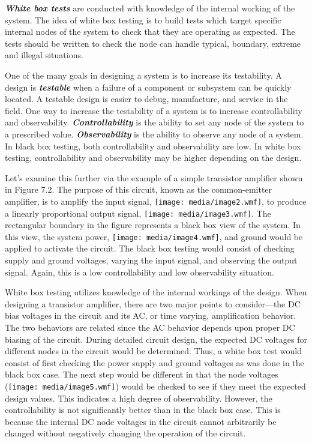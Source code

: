 \emph{\textbf{White box tests}} are conducted with knowledge of the
internal working of the system. The idea of white box testing is to
build tests which target specific internal nodes of the system to check
that they are operating as expected. The tests should be written to
check the node can handle typical, boundary, extreme and illegal
situations.

One of the many goals in designing a system is to increase its
testability. A design is \emph{\textbf{testable}} when a failure of a
component or subsystem can be quickly located. A testable design is
easier to debug, manufacture, and service in the field. One way to
increase the testability of a system is to increase controllability and
observability. \emph{\textbf{Controllability}} is the ability to set any
node of the system to a prescribed value. \textbf{\emph{Observability}}
is the ability to observe any node of a system. In black box testing,
both controllability and observability are low. In white box testing,
controllability and observability may be higher depending on the design.

Let's examine this further via the example of a simple transistor
amplifier shown in Figure 7.2. The purpose of this circuit, known as the
common-emitter amplifier, is to amplify the input signal,
\texttt{[image: media/image2.wmf]}, to produce a linearly proportional
output signal, \texttt{[image: media/image3.wmf]}. The rectangular
boundary in the figure represents a black box view of the system. In
this view, the system power, \texttt{[image: media/image4.wmf]}, and
ground would be applied to activate the circuit. The black box testing
would consist of checking supply and ground voltages, varying the input
signal, and observing the output signal. Again, this is a low
controllability and low observability situation.

White box testing utilizes knowledge of the internal workings of the
design. When designing a transistor amplifier, there are two major
points to consider---the DC bias voltages in the circuit and its AC, or
time varying, amplification behavior. The two behaviors are related
since the AC behavior depends upon proper DC biasing of the circuit.
During detailed circuit design, the expected DC voltages for different
nodes in the circuit would be determined. Thus, a white box test would
consist of first checking the power supply and ground voltages as was
done in the black box case. The next step would be different in that the
node voltages (\texttt{[image: media/image5.wmf]}) would be checked to
see if they meet the expected design values. This indicates a high
degree of observability. However, the controllability is not
significantly better than in the black box case. This is because the
internal DC node voltages in the circuit cannot arbitrarily be changed
without negatively changing the operation of the circuit.

